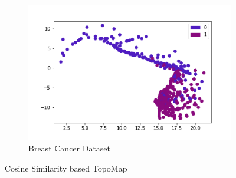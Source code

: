 \documentclass[11pt, a4paper]{article}
\begin{document}
\begin{figure}[h]
\begin{subfigure}[b]{0.3\textwidth}
            \includegraphics[width=\textwidth]{breast_cancer_angle_1.png}
            \caption{Breast Cancer Dataset}
            \label{breast_cancer_angle}
        \end{subfigure}
            \caption{Cosine Similarity based TopoMap}
            \label{angle}
    \end{figure}
\end{document}
